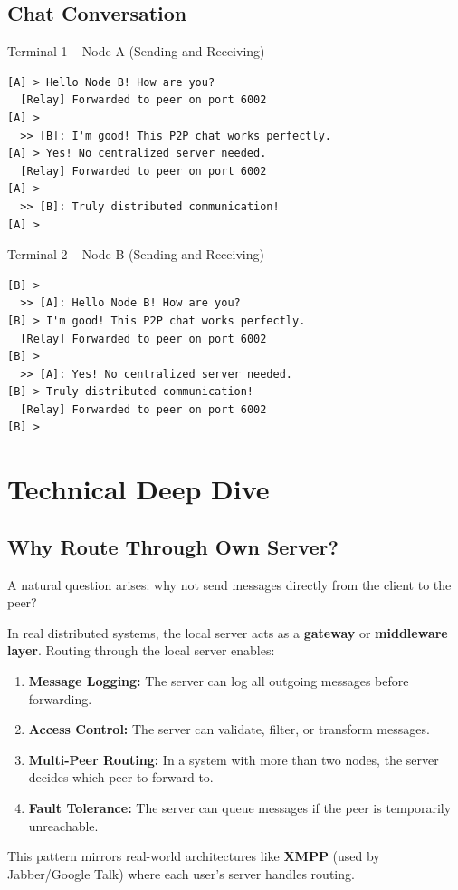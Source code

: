 \documentclass[11pt]{article}
\begin{document}
\subsection{Chat Conversation}

\begin{terminalbox}{Terminal 1 -- Node A (Sending and Receiving)}
\begin{lstlisting}[style=terminalstyle]
[A] > Hello Node B! How are you?
  [Relay] Forwarded to peer on port 6002
[A] >
  >> [B]: I'm good! This P2P chat works perfectly.
[A] > Yes! No centralized server needed.
  [Relay] Forwarded to peer on port 6002
[A] >
  >> [B]: Truly distributed communication!
[A] >
\end{lstlisting}
\end{terminalbox}

\begin{terminalbox}{Terminal 2 -- Node B (Sending and Receiving)}
\begin{lstlisting}[style=terminalstyle]
[B] >
  >> [A]: Hello Node B! How are you?
[B] > I'm good! This P2P chat works perfectly.
  [Relay] Forwarded to peer on port 6002
[B] >
  >> [A]: Yes! No centralized server needed.
[B] > Truly distributed communication!
  [Relay] Forwarded to peer on port 6002
[B] >
\end{lstlisting}
\end{terminalbox}

\newpage

\section{Technical Deep Dive}

\subsection{Why Route Through Own Server?}

A natural question arises: why not send messages directly from the client to the peer?

\begin{shadedbox}
In real distributed systems, the local server acts as a \textbf{gateway} or \textbf{middleware layer}. Routing through the local server enables:

\begin{enumerate}
    \item \textbf{Message Logging:} The server can log all outgoing messages before forwarding.
    \item \textbf{Access Control:} The server can validate, filter, or transform messages.
    \item \textbf{Multi-Peer Routing:} In a system with more than two nodes, the server decides which peer to forward to.
    \item \textbf{Fault Tolerance:} The server can queue messages if the peer is temporarily unreachable.
\end{enumerate}

This pattern mirrors real-world architectures like \textbf{XMPP} (used by Jabber/Google Talk) where each user's server handles routing.
\end{shadedbox}
\end{document}
